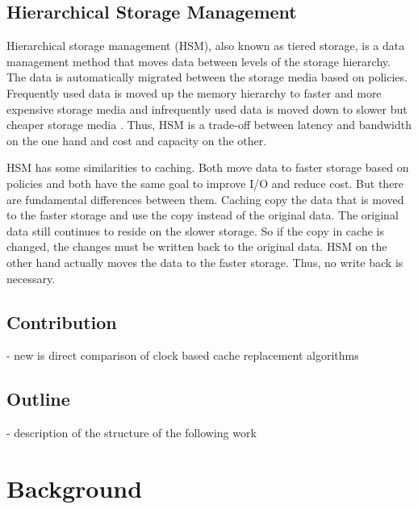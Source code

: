 \documentclass[
	12pt,
	a4paper,
	abstract,
	bibliography=totoc,
	chapterprefix,
	headings=openright,
	numbers=endperiod,
	parskip=half,
	twoside,
]{scrreprt}
\begin{document}
\section{Hierarchical Storage Management}


Hierarchical storage management (HSM), also known as tiered storage, is a data management method that moves data between levels of the storage hierarchy.
The data is automatically migrated between the storage media based on policies.
Frequently used data is moved up the memory hierarchy to faster and more expensive 
storage media and infrequently used data is moved down to slower but cheaper storage media
 \cite{lugar2001hierarchical}.
Thus, HSM is a trade-off between latency and bandwidth on the one hand 
and cost and capacity on the other.

HSM has some similarities to caching.
Both move data to faster storage based on policies and both have the same goal to improve I/O 
and reduce cost.
But there are fundamental differences between them.
Caching copy the data that is moved to the faster storage and use the copy instead of the original data. 
The original data still continues to reside on the slower storage.
So if the copy in cache is changed, the changes must be written back to the original data.
HSM on the other hand actually moves the data to the faster storage.
Thus, no write back is necessary.

\section{Contribution}
- new is direct comparison of clock based cache replacement algorithms\\

\section{Outline}
- description of the structure of the following work\\


\chapter{Background}
\label{cha:background}
\end{document}
